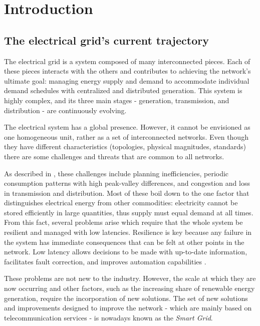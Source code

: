\section{Introduction}
\subsection{The electrical grid's current trajectory}
The electrical grid is a system composed of many interconnected pieces. Each of these pieces interacts with the others and contributes to achieving the network's ultimate goal: managing energy supply and demand to accommodate individual demand schedules with centralized and distributed generation. This system is highly complex, and its three main stages - generation, transmission, and distribution - are continuously evolving.

The electrical system has a global presence. However, it cannot be envisioned as one homogeneous unit, rather as a set of interconnected networks. Even though they have different characteristics (topologies, physical magnitudes, standards) there are some challenges and threats that are common to all networks. 


As described in \cite{the_new_frontier_of_smart_grids}, these challenges include planning inefficiencies, periodic consumption patterns with high peak-valley differences, and congestion and loss in transmission and distribution. Most of these boil down to the one factor that distinguishes electrical energy from other commodities: electricity cannot be stored efficiently in large quantities, thus supply must equal demand at all times. From this fact, several problems arise which require that the whole system be resilient and managed with low latencies. Resilience is key because any failure in the system has immediate consequences that can be felt at other points in the network. Low latency allows decisions to be made with up-to-date information, facilitates fault correction, and improves automation capabilities \cite{telco_ntwks_for_the_smart_grid}.

These problems are not new to the industry. However, the scale at which they are now occurring and other factors, such as the increasing share of renewable energy generation,  require the incorporation of new solutions. The set of new solutions and improvements designed to improve the network - which are mainly based on telecommunication services - is nowadays known as the \textit{Smart Grid}. 


